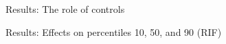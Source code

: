 \documentclass[11pt, aspectratio=169]{beamer}
\begin{document}
\begin{frame}{Results: The role of controls}
    \centering
\end{frame}


\begin{frame}{Results: Effects on percentiles 10, 50, and 90 (RIF)}
    \centering
\end{frame}
\end{document}
